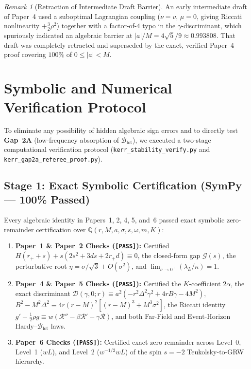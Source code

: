 \documentclass[11pt, a4paper]{article}
\theoremstyle{remark}
\newtheorem{remark}{Remark}
\begin{document}
\begin{remark}[Retraction of Intermediate Draft Barrier]
An early intermediate draft of Paper~4 used a suboptimal Lagrangian coupling ($\nu = v$, $\mu = 0$, giving Riccati nonlinearity $+\frac{3}{2}\rho^2$) together with a factor-of-$4$ typo in the $\gamma$-discriminant, which spuriously indicated an algebraic barrier at $|a|/M = 4\sqrt{5}/9 \approx 0.993808$. That draft was completely retracted and superseded by the exact, verified Paper~4 proof covering $100\%$ of $0 \le |a| < M$.
\end{remark}

\section{Symbolic and Numerical Verification Protocol}

To eliminate any possibility of hidden algebraic sign errors and to directly test \textbf{Gap~2A} (low-frequency absorption of $\mathcal{B}_{\mathrm{lot}}$), we executed a two-stage computational verification protocol (\texttt{kerr\_stability\_verify.py} and \texttt{kerr\_gap2a\_referee\_proof.py}).

\subsection{Stage 1: Exact Symbolic Certification (SymPy --- 100\% Passed)}

Every algebraic identity in Papers~1, 2, 4, 5, and~6 passed exact symbolic zero-remainder certification over $\mathbb{Q}(r, M, a, \sigma, s, \omega, m, K)$:
\begin{enumerate}
\item \textbf{Paper~1 \& Paper~2 Checks (\texttt{[PASS]}):} Certified $H(r_+ + s) + s(2s^2 + 3ds + 2r_+ d) \equiv 0$, the closed-form gap $\mathcal{G}(s)$, the perturbative root $\eta = \sigma/\sqrt{3} + O(\sigma^2)$, and $\lim_{\sigma \to 0^+}(\lambda_L / \kappa) = 1$.
\item \textbf{Paper~4 \& Paper~5 Checks (\texttt{[PASS]}):} Certified the $K$-coefficient $2\alpha$, the exact discriminant $\mathcal{D}(\gamma, 0; r) \equiv a^2(-r^2\Delta^2\gamma^2 + 4rB\gamma - 4M^2)$, $B^2 - M^2\Delta^2 \equiv 4r(r-M)^2[(r-M)^3 + M^3\sigma^2]$, the Riccati identity $g' + \frac{1}{2}\rho g \equiv w(\mathcal{R}'' - \beta\mathcal{R}' + \gamma\mathcal{R})$, and both Far-Field and Event-Horizon Hardy--$\mathcal{B}_{\mathrm{lot}}$ laws.
\item \textbf{Paper~6 Checks (\texttt{[PASS]}):} Certified exact zero remainder across Level~0, Level~1 ($wL$), and Level~2 ($w^{-1/2}wL$) of the spin $s = -2$ Teukolsky-to-GRW hierarchy.
\end{enumerate}
\end{document}
